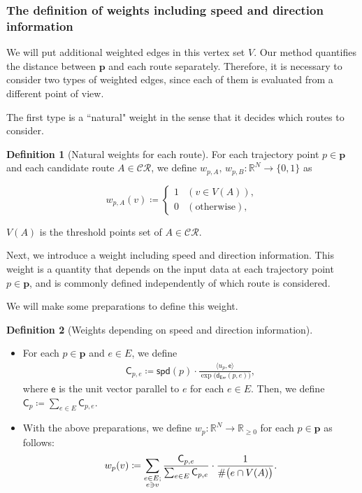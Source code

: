 \documentclass{article}
\numberwithin{equation}{section}
\theoremstyle{definition}
\newtheorem{definition}{Definition}[section]
\newcommand{\derr}{\mathsf{d}_{\mathsf{Err}}}
\newcommand{\CR}{\mathcal{CR}}
\newcommand{\ee}{\mathsf{e}}
\newcommand{\cc}{\mathsf{C}}
\newcommand{\R}{\mathbb{R}}
\newcommand{\spd}{\mathsf{spd}}
\def\:={\coloneqq} %
\begin{document}
\subsubsection{The definition of weights including speed and direction information}

We will put additional weighted edges in this vertex set $V$.
Our method quantifies the distance between $\mathbf{p}$ and each route separately.
Therefore, it is necessary to consider two types of weighted edges, since each of them is evaluated from a different point of view.

The first type is a ``natural" weight in the sense that it decides which routes to consider.

\begin{definition}[Natural weights for each route] \label{normal-weight}
For each trajectory point $p\in\mathbf{p}$ and each candidate route $A\in\CR$, we define $w_{p,A},\,w_{p,B}:\R^N\to\{0,1\}$ as
\begin{center} \vspace{-6mm}
\[ w_{p,A}(v) \:= 
\begin{cases}
1 & (v\in V(A)),   \\
0 & (\text{otherwise}),
\end{cases} \]
\end{center} 
$V(A)$ is the threshold points set of $A\in\CR$.
\end{definition}

Next, we introduce a weight including speed and direction information.
This weight is a quantity that depends on the input data at each trajectory point $p\in\mathbf{p}$, and is commonly defined independently of which route is considered.

We will make some preparations to define this weight.

\begin{definition}[Weights depending on speed and direction information] \label{s&d-weight}
$ $\newline
\begin{itemize} \vspace{-6mm}
    \item For each $p\in\mathbf{p}$ and $e\in E$, we define 
    \begin{align*}
        \cc_{p,e}\:= \spd(p)\cdot\frac{\langle u_p,\ee \rangle}{\exp\big(\derr(p,e)\big)},
    \end{align*}
    where $\ee$ is the unit vector parallel to $e$ for each $e\in E$.
    Then, we define $\cc_p\:=\sum_{e\in E}\cc_{p,e}$.
    \item With the above preparations, we define $w_p:\R^N\to\R_{\ge0}$ for each $p\in\mathbf{p}$ as follows:
    \begin{align*} \vspace{-6mm}
    w_p(v) \:=
    \sum_{{\substack{e\in E;\\e\ni v}}} \frac{\cc_{p,e}}{\sum_{e\in E}\cc_{p,e}}\cdot\frac{1}{\#\big(e\cap V(A)\big)}.
    \end{align*} 
    \end{itemize}
\end{definition}
\end{document}
